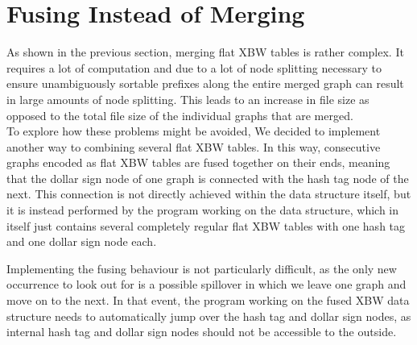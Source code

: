 \documentclass[a4paper,12pt,twoside,BCOR=10mm]{scrbook}
\begin{document}

\section{Fusing Instead of Merging}
\label{sec:fusing_instead_of_merging}
%

As shown in the previous section, merging flat XBW tables is rather complex. 
It requires a lot of computation and due to a lot of node splitting 
necessary to ensure unambiguously sortable prefixes along the entire merged 
graph can result in large amounts of node splitting. This leads to an increase 
in file size as opposed to the total file size of the individual graphs that are 
merged. \\
To explore how these problems might be avoided, 
We decided to implement another way to combining several flat XBW tables. 
In this way, consecutive graphs encoded as flat XBW tables are fused together on their ends, 
meaning that the dollar sign node of one graph is connected with the hash tag node of the next. 
This connection is not directly achieved within the data structure itself, 
but it is instead performed by the program working on the data structure, 
which in itself just contains several completely regular flat XBW tables with 
one hash tag and one dollar sign node each.

Implementing the fusing behaviour is not particularly difficult, 
as the only new occurrence to look out for is a possible spillover in which 
we leave one graph and move on to the next. In that event, the program working 
on the fused XBW data structure needs to automatically jump over the hash tag and dollar sign nodes, 
as internal hash tag and dollar sign nodes should not be accessible to the outside.


\end{document}
